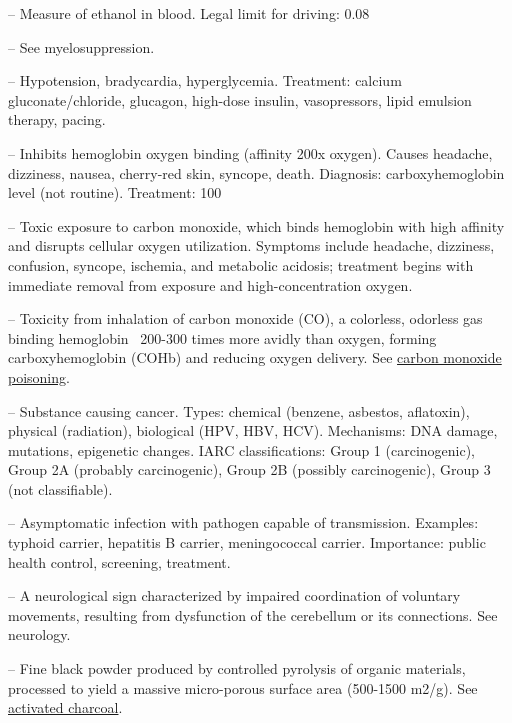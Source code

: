 -- Measure of ethanol in blood. Legal limit for driving: 0.08%

-- See myelosuppression.

-- Hypotension, bradycardia, hyperglycemia. Treatment: calcium gluconate/chloride, glucagon, high-dose insulin, vasopressors, lipid emulsion therapy, pacing.

-- Inhibits hemoglobin oxygen binding (affinity 200x oxygen). Causes headache, dizziness, nausea, cherry-red skin, syncope, death. Diagnosis: carboxyhemoglobin level (not routine). Treatment: 100%

-- Toxic exposure to carbon monoxide, which binds hemoglobin with high affinity and disrupts cellular oxygen utilization. Symptoms include headache, dizziness, confusion, syncope, ischemia, and metabolic acidosis; treatment begins with immediate removal from exposure and high-concentration oxygen.

-- Toxicity from inhalation of carbon monoxide (CO), a colorless, odorless gas binding hemoglobin ~200-300 times more avidly than oxygen, forming carboxyhemoglobin (COHb) and reducing oxygen delivery. See \hyperlink{Carbon Monoxide Poisoning}{carbon monoxide poisoning}.

-- Substance causing cancer. Types: chemical (benzene, asbestos, aflatoxin), physical (radiation), biological (HPV, HBV, HCV). Mechanisms: DNA damage, mutations, epigenetic changes. IARC classifications: Group 1 (carcinogenic), Group 2A (probably carcinogenic), Group 2B (possibly carcinogenic), Group 3 (not classifiable).

-- Asymptomatic infection with pathogen capable of transmission. Examples: typhoid carrier, hepatitis B carrier, meningococcal carrier. Importance: public health control, screening, treatment.

-- A neurological sign characterized by impaired coordination of voluntary movements, resulting from dysfunction of the cerebellum or its connections. See neurology.

-- Fine black powder produced by controlled pyrolysis of organic materials, processed to yield a massive micro-porous surface area (500-1500 m2/g). See \hyperlink{Activated Charcoal}{activated charcoal}.

